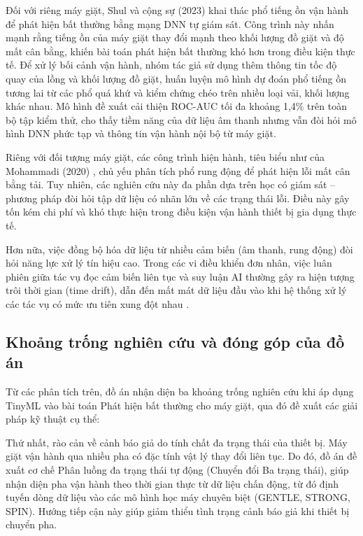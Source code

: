 Đối với riêng máy giặt, Shul và cộng sự (2023) \cite{ref_shul_2023} khai thác phổ tiếng ồn vận hành để phát hiện bất thường bằng mạng DNN tự giám sát. Công trình này nhấn mạnh rằng tiếng ồn của máy giặt thay đổi mạnh theo khối lượng đồ giặt và độ mất cân bằng, khiến bài toán phát hiện bất thường khó hơn trong điều kiện thực tế. Để xử lý bối cảnh vận hành, nhóm tác giả sử dụng thêm thông tin tốc độ quay của lồng và khối lượng đồ giặt, huấn luyện mô hình dự đoán phổ tiếng ồn tương lai từ các phổ quá khứ và kiểm chứng chéo trên nhiều loại vải, khối lượng khác nhau. Mô hình đề xuất cải thiện ROC-AUC tối đa khoảng 1,4\% trên toàn bộ tập kiểm thử, cho thấy tiềm năng của dữ liệu âm thanh nhưng vẫn đòi hỏi mô hình DNN phức tạp và thông tin vận hành nội bộ từ máy giặt.

Riêng với đối tượng máy giặt, các công trình hiện hành, tiêu biểu như của Mohammadi (2020) \cite{ref_1_3}, chủ yếu phân tích phổ rung động để phát hiện lỗi mất cân bằng tải. Tuy nhiên, các nghiên cứu này đa phần dựa trên học có giám sát – phương pháp đòi hỏi tập dữ liệu có nhãn lớn về các trạng thái lỗi. Điều này gây tốn kém chi phí và khó thực hiện trong điều kiện vận hành thiết bị gia dụng thực tế. 

Hơn nữa, việc đồng bộ hóa dữ liệu từ nhiều cảm biến (âm thanh, rung động) đòi hỏi năng lực xử lý tín hiệu cao. Trong các vi điều khiển đơn nhân, việc luân phiên giữa tác vụ đọc cảm biến liên tục và suy luận AI thường gây ra hiện tượng trôi thời gian (time drift), dẫn đến mất mát dữ liệu đầu vào khi hệ thống xử lý các tác vụ có mức ưu tiên xung đột nhau \cite{ref_1_11}.

\subsection{Khoảng trống nghiên cứu và đóng góp của đồ án}

Từ các phân tích trên, đồ án nhận diện ba khoảng trống nghiên cứu khi áp dụng TinyML vào bài toán Phát hiện bất thường cho máy giặt, qua đó đề xuất các giải pháp kỹ thuật cụ thể:

Thứ nhất, rào cản về cảnh báo giả do tính chất đa trạng thái của thiết bị. Máy giặt vận hành qua nhiều pha có đặc tính vật lý thay đổi liên tục. Do đó, đồ án đề xuất cơ chế Phân luồng đa trạng thái tự động (Chuyển đổi Ba trạng thái), giúp nhận diện pha vận hành theo thời gian thực từ dữ liệu chấn động, từ đó định tuyến dòng dữ liệu vào các mô hình học máy chuyên biệt (GENTLE, STRONG, SPIN). Hướng tiếp cận này giúp giảm thiểu tình trạng cảnh báo giả khi thiết bị chuyển pha.

